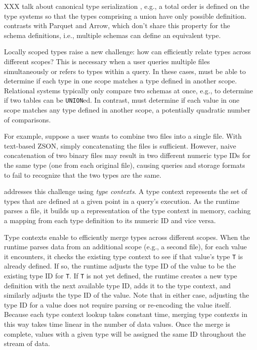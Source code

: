 XXX talk about canonical type serialization , e.g., a total order is defined on the type systems so that the types comprising a union have only possible definition.  contrasts with Parquet and Arrow, which don't share this property for the schema definitions, i.e., multiple schemas can define an equivalent type.

Locally scoped types raise a new challenge: how can \sys{} efficiently relate types across different scopes? This is necessary when a user queries multiple files simultaneously or refers to types within a query. In these cases, \sys{} must be able to determine if each type in one scope matches a type defined in another scope. Relational systems typically only compare two schemas at once, e.g., to determine if two tables can be \texttt{UNION}ed. In contrast, \sys{} must determine if each value in one scope matches any type defined in another scope, a potentially quadratic number of comparisons.

For example, suppose a user wants to combine two \sys{} files into a single file. With text-based ZSON, simply concatenating the files is sufficient. However, naive concatenation of two binary \sys{} files may result in two different numeric type IDs for the same type (one from each original file), causing queries and storage formats to fail to recognize that the two types are the same.

\sys{} addresses this challenge using {\em type contexts}. A type context represents the set of types that are defined at a given point in a query's execution. As the \sys{} runtime parses a file, it builds up a representation of the type context in memory, caching a mapping from each type definition to its numeric ID and vice versa.

Type contexts enable \sys{} to efficiently merge types across different scopes. When the runtime parses data from an additional scope (e.g., a second file), for each value it encounters, it checks the existing type context to see if that value's type \texttt{T} is already defined. If so, the runtime adjusts the type ID of the value to be the existing type ID for \texttt{T}. If \texttt{T} is not yet defined, the runtime creates a new type definition with the next available type ID, adds it to the type context, and similarly adjusts the type ID of the value. Note that in either case, adjusting the type ID for a value does not require parsing or re-encoding the value itself. Because each type context lookup takes constant time, merging type contexts in this way takes time linear in the number of data values. Once the merge is complete, values with a given type will be assigned the same ID throughout the stream of data.


